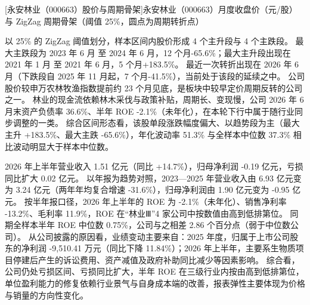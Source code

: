 \begin{center}
\begin{minipage}{\textwidth}\centering
{}

[永安林业（000663）股价与周期骨架]{永安林业（000663）月度收盘价（元/股）与 ZigZag 周期骨架（阈值 25\%，圆点为周期转折点）}
\end{minipage}
\end{center}

 以 25\% 的 ZigZag 阈值划分，样本区间内股价形成 4 个主升段与 4 个主跌段。 最大主跌段为 2023 年 6 月 至 2024 年 6 月，12 个月-65.6\%；最大主升段出现在 2021 年 1 月 至 2021 年 6 月，5 个月+183.5\%。 最近一次转折出现在 2026 年 6 月（下跌段自 2025 年 11 月起，7 个月-41.5\%），当前处于该段的延续之中。 公司股价较申万农林牧渔指数提前约 23 个月见底，是板块中较早定价周期反转的公司之一。 林业的现金流依赖林木采伐与政策补贴，周期长、变现慢，公司 2026 年 6 月末资产负债率 36.6\%、半年 ROE -2.1\%（未年化），在本轮下行中属于随行业同步调整的一类。 综合区间形态看，该股单段涨跌幅度偏大、以趋势段为主（最大主升 +183.5\%、最大主跌 -65.6\%），年化波动率 51.3\% 与全样本中位数 37.3\% 相比波动明显大于样本中位数。

 2026 年上半年营业收入 1.51 亿元（同比 +14.7\%），归母净利润 -0.19 亿元，亏损同比扩大 0.02 亿元。 以年报为趋势对照，2023---2025 年营业收入由 6.93 亿元变为 3.24 亿元（两年年均复合增速 -31.6\%），归母净利润由 1.90 亿元变为 -0.95 亿元。 按半年报口径，2026 年上半年的 ROE 为 -2.1\%（未年化）、销售净利率 -13.2\%、毛利率 11.9\%，ROE 在“林业Ⅲ”4 家公司中按数值由高到低排第位。 同期全样本半年 ROE 中位数 0.75\%，公司与之相差 2.86 个百分点（弱于中位数公司）。 从公司披露的原因看，业绩变动主要来自：2025 年度，归属于上市公司股东的净利润 -9,510.41 万元（同比下降 11.84\%）；2026 年上半年，主要系生物质项目停建后产生的诉讼费用、资产减值及政府补助同比减少等因素影响。 综合看，公司仍处亏损区间、亏损同比扩大，半年 ROE 在三级行业内按由高到低排第位，单位盈利能力的修复依赖行业景气与自身成本端的改善，报表弹性主要体现为价格与销量的方向性变化。

